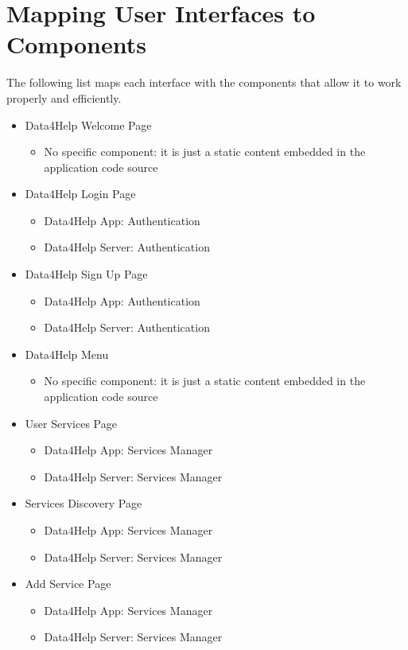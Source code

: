 \documentclass[../DD.tex]{subfiles}
\begin{document}
	\section{Mapping User Interfaces to Components}
	The following list maps each interface with the components that allow it to work properly and efficiently.
	\begin{itemize}
		\item Data4Help Welcome Page
			\begin{itemize}\item{No specific component: it is just a static content embedded in the application code source}\end{itemize}
		\item Data4Help Login Page
			\begin{itemize}\item{Data4Help App: Authentication}\item{Data4Help Server: Authentication}\end{itemize}
		\item Data4Help Sign Up Page
			\begin{itemize}\item{Data4Help App: Authentication}\item{Data4Help Server: Authentication}\end{itemize}
		\item Data4Help Menu
			\begin{itemize}\item{No specific component: it is just a static content embedded in the application code source}\end{itemize}
		\item User Services Page	
			\begin{itemize}\item{Data4Help App: Services Manager} \item{Data4Help Server: Services Manager}\end{itemize}	
		\item Services Discovery Page			
			\begin{itemize}\item{Data4Help App: Services Manager} \item{Data4Help Server: Services Manager}\end{itemize}	
		\item Add Service Page
			\begin{itemize}\item{Data4Help App: Services Manager} \item{Data4Help Server: Services Manager}\end{itemize}

\end{itemize}
\end{document}
